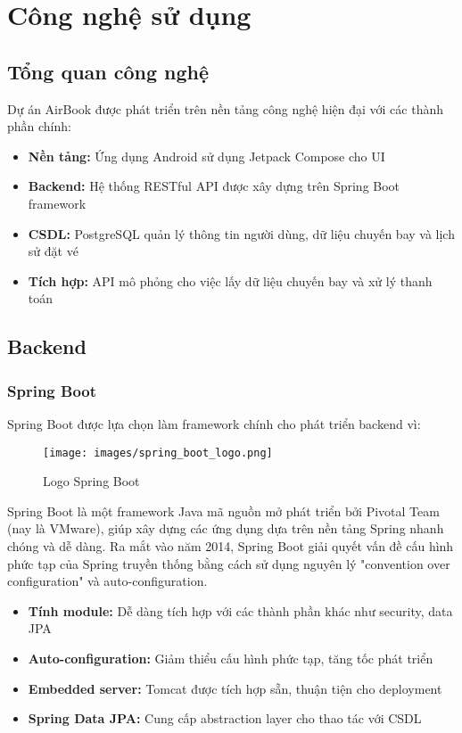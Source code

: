\section{Công nghệ sử dụng}

\subsection{Tổng quan công nghệ}
Dự án AirBook được phát triển trên nền tảng công nghệ hiện đại với các thành phần chính:

\begin{itemize}[leftmargin=1cm]
    \item \textbf{Nền tảng:} Ứng dụng Android sử dụng Jetpack Compose cho UI
    \item \textbf{Backend:} Hệ thống RESTful API được xây dựng trên Spring Boot framework
    \item \textbf{CSDL:} PostgreSQL quản lý thông tin người dùng, dữ liệu chuyến bay và lịch sử đặt vé
    \item \textbf{Tích hợp:} API mô phỏng cho việc lấy dữ liệu chuyến bay và xử lý thanh toán
\end{itemize}

\subsection{Backend}

\subsubsection{Spring Boot}
Spring Boot được lựa chọn làm framework chính cho phát triển backend vì:

\begin{figure}[H]
\centering
\texttt{[image: images/spring\_boot\_logo.png]}
\caption{Logo Spring Boot}
\end{figure}

Spring Boot là một framework Java mã nguồn mở phát triển bởi Pivotal Team (nay là VMware), giúp xây dựng các ứng dụng dựa trên nền tảng Spring nhanh chóng và dễ dàng. Ra mắt vào năm 2014, Spring Boot giải quyết vấn đề cấu hình phức tạp của Spring truyền thống bằng cách sử dụng nguyên lý "convention over configuration" và auto-configuration.

\begin{itemize}[leftmargin=1cm]
    \item \textbf{Tính module:} Dễ dàng tích hợp với các thành phần khác như security, data JPA
    \item \textbf{Auto-configuration:} Giảm thiểu cấu hình phức tạp, tăng tốc phát triển
    \item \textbf{Embedded server:} Tomcat được tích hợp sẵn, thuận tiện cho deployment
    \item \textbf{Spring Data JPA:} Cung cấp abstraction layer cho thao tác với CSDL
\end{itemize}

